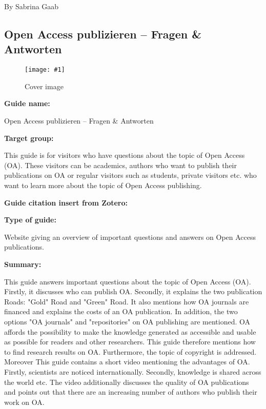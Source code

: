\documentclass{article}
\newlength{\imgwidth}
\newcommand\scaledgraphics[2]{%
                
\settowidth{\imgwidth}{\texttt{[image: \#1]}}%
                
\setlength{\imgwidth}{\minof{\imgwidth}{#2\textwidth}}%
                
\texttt{[image: \#1]}%
                
}
\begin{document}
By Sabrina Gaab 





\subsection{Open Access publizieren – Fragen \& Antworten}\label{H4741497}


\begin{figure}
\scaledgraphics{f61a96b6-6ada-4caf-b8f3-1ef6ac943b93.png}{1}
\caption*{Cover image}\label{F90452781}
\end{figure}




\textbf{Guide name:} 

Open Access publizieren – Fragen \& Antworten


\textbf{Target group:}

This guide is for visitors who have questions about the topic of Open Access (OA). These visitors can be academics, authors who want to publish their publications on OA or regular visitors such as students, private visitors etc. who want to learn more about the topic of Open Access publishing.


\textbf{Guide citation insert from Zotero:}

\autocite{bundesministerium_fur_bildung_und_forschung_open_2021}


\textbf{Type of guide:}

Website giving an\textbf{ }overview of important questions and answers on Open Access publications.


\textbf{Summary:}

This guide answers important questions about the topic of Open Access (OA). Firstly, it discusses who can publish OA. Secondly, it explains the two publication Roads: "Gold" Road and "Green" Road. It also mentions how OA journals are financed and explains the costs of an OA publication. In addition, the two options "OA journals" and "repositories" on OA publishing are mentioned. OA affords the possibility to make the knowledge generated as accessible and usable as possible for readers and other researchers. This guide therefore mentions how to find research results on OA. Furthermore, the topic of copyright is addressed. Moreover This guide contains a short video mentioning the advantages of OA. Firstly, scientists are noticed internationally. Secondly, knowledge is shared across the world etc. The video additionally discusses the quality of OA publications and points out that there are an increasing number of authors who publish their work on OA.
\end{document}
